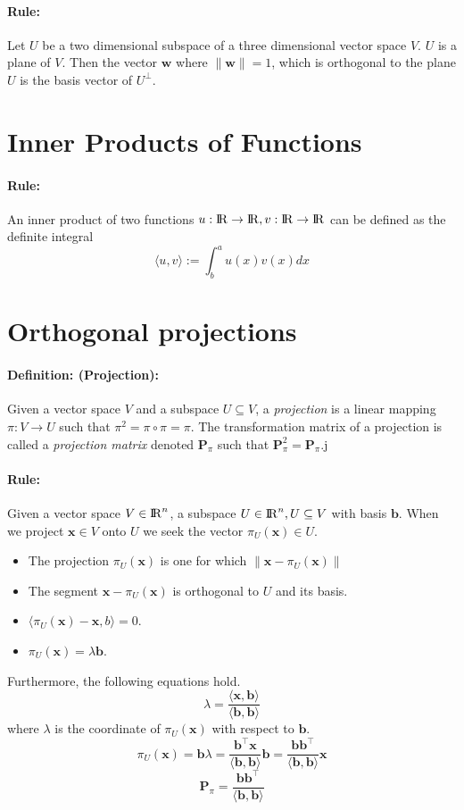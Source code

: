 \documentclass[12pt]{article}
\newcommand{\R}{{\rm I\!R}}
\newcommand{\Rn}{{\R^n}}
\newcommand{\bx}{{\bm{x}}}
\newcommand{\bb}{{\bm{b}}}
\newcommand{\0}[0]{\bm{0}}
\newcommand{\ipr}[1]{\langle #1 \rangle}
\newcommand{\norm}[1]{\lVert#1\rVert}
\newcommand{\xdefinition}[2]{\paragraph{\colorbox{#1!30}{\textbf{Definition:}} (#2):}}
\newcommand{\xrule}[1]{\paragraph{\colorbox{#1!30}{\textbf{Rule:}}}}
\begin{document}
\xrule{red} Let $U$ be a two dimensional subspace of a three dimensional vector space $V$. $U$ is a plane of $V$. Then the vector $\bm{w}$ where $\norm{\bm{w}} = 1$, which is orthogonal to the plane $U$ is the basis vector of $U^{\perp}$.

\section{Inner Products of Functions}

\xrule{red} An inner product of two functions $u : \R \rightarrow \R, v : \R \rightarrow \R$ can be defined as the definite integral
%
\begin{equation}
	\ipr{u, v} := \int_b^a u(x) v(x) dx
\end{equation}

\section{Orthogonal projections}

\xdefinition{red}{Projection} Given a vector space $V$ and a subspace $U \subseteq V$, a \textit{projection} is a linear mapping $\pi : V \rightarrow U$ such that $\pi^2 = \pi \circ \pi = \pi$.
%
The transformation matrix of a projection is called a \textit{projection matrix} denoted $\bm{P}_\pi$ such that $\bm{P}_\pi^2 = \bm{P}_\pi$.j

\xrule{red} Given a vector space $V \in \Rn$, a subspace $U \in \Rn, U \subseteq V$ with basis $\bb$. When we project $\bx \in V$ onto $U$ we seek the vector $\pi_U(\bx) \in U$.
%
\begin{itemize}
	\item The projection $\pi_U(\bx)$ is one for which $\norm{\bx - \pi_U(\bx)}$
	\item The segment $\bx - \pi_U(\bx)$ is orthogonal to $U$ and its basis.
	\item $\ipr{\pi_U(\bx) - \bx, b} = 0$.
	\item $\pi_U(\bx) = \lambda \bb$.
\end{itemize}
%
Furthermore, the following equations hold.
%
\begin{equation}
	\lambda = \frac{\ipr{\bx, \bb}}{\ipr{\bb, \bb}}
\end{equation}
%
where $\lambda$ is the coordinate of $\pi_U(\bx)$ with respect to $\bb$.
%
\begin{equation}
	\pi_U(\bx) = \bb \lambda = \frac{\bb^\top \bx}{\ipr{\bb, \bb}} \bb = \frac{\bb \bb^\top}{\ipr{\bb, \bb}} \bx
\end{equation}
%
\begin{equation}
	\bm{P}_\pi = \frac{\bb \bb^\top}{\ipr{\bb, \bb}}
\end{equation}
\end{document}
